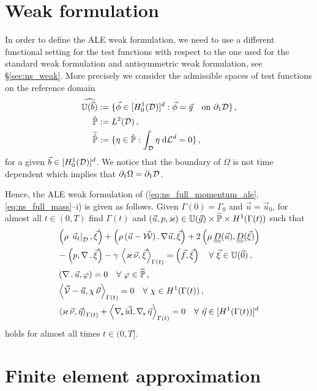 \section{Weak formulation}\label{sec:ale_weak}
In order to define the ALE weak formulation, we need to use a different
functional setting for the test functions with respect to the one used for the
standard weak formulation and antisymmetric weak formulation, see
\S\ref{sec:ns_weak}. More precisely we consider the admissible spaces of test
functions on the reference domain
\begin{align*}
\widehat{\mathbb{U}(\vec{b})} &:= \{\vec \phi\in[H^1_0(\mathcal D)]^d:\vec \phi =\vec
g\quad \mbox{on }\partial_1\mathcal D\}\,,\\
\hat{\mathbb{P}} &:= L^2(\mathcal D)\,,\\
\widetilde{\hat{\mathbb{P}}} &:= \{\eta\in\hat{\mathbb{P}} : \int_\mathcal D\eta\;{\rm d}{\cal L}^{d}=0 \}\,,
\end{align*}
for a given $\vec b \in [H^1_0(\mathcal D)]^d$. We notice that the boundary
of $\Omega$ is not time dependent which implies that
$\partial_1\Omega=\partial_1\mathcal D$.

Hence, the ALE weak formulation of (\ref{eq:ns_full_momentum_ale},
\ref{eq:ns_full_mass}--i) is given as follows. Given $\Gamma(0) = \Gamma_0$ and
$\vec u = \vec u_0$, for almost all $t\in(0,T)$ find $\Gamma(t)$ and ${(\vec u,
p, \varkappa)\in \mathbb{U}(\vec{g}) \times \widetilde{\mathbb{P}} \times H^1(\Gamma(t))}$
such that
\begin{subequations}
\begin{align}
& \left(\rho\,\left.\vec u_t\right|_{\D}, \vec \xi\right) +
\left(\rho\,(\vec u - \W)\,.\, \nabla \vec u,\vec \xi\right)
+ 2\left(\mu\,\mat D(\vec u), \mat D(\vec \xi)\right) \nonumber \\
& - \left(p, \nabla\,.\,\vec \xi\right)
- \gamma\,\left\langle \varkappa\,\vec\nu, \vec\xi\right\rangle_{\Gamma(t)}
= \left(\vec f, \vec \xi\right)\quad \forall\ \vec\xi \in \uspace 0 \,,
\label{eq:ns_weaka_ale}\\
& \left(\nabla\,.\,\vec u, \varphi\right) = 0
\quad \forall\ \varphi \in \pnormspace\,, \label{eq:ns_weakb_ale} \\
&  \left\langle \V
- \vec u, \chi\,\vec\nu \right\rangle_{\Gamma(t)} = 0
\quad \forall\ \chi \in H^1(\Gamma(t))\,, \label{eq:ns_weakc_ale} \\
& \left\langle \varkappa\,\vec\nu, \vec\eta \right\rangle_{\Gamma(t)}
+ \left\langle \nabs\,\vec \id, \nabs\,\vec \eta \right\rangle_{\Gamma(t)}
= 0  \quad \forall\ \vec\eta \in [H^1(\Gamma(t))]^d\,\label{eq:ns_weakd_ale}
\end{align}
\end{subequations}
holds for almost all times $t \in (0,T]$.

\section{Finite element approximation}\label{sec:ale_fem}
